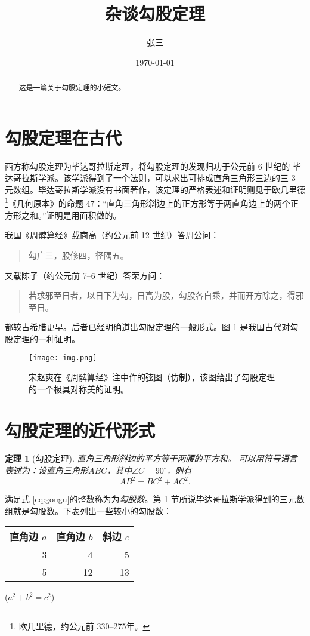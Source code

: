 \documentclass[UTF8,18pt]{ctexart}
\title{\heiti 杂谈勾股定理}
\author{\kaishu 张三}
\date{\today}
\newenvironment{myquote}
{\begin{quote}\kaishu\zihao{-5}}
	{\end{quote}}
\newtheorem{thm}{定理}
\begin{document}
	
\maketitle
\begin{abstract}
这是一篇关于勾股定理的小短文。
\end{abstract}
\tableofcontents
\section{勾股定理在古代}
西方称勾股定理为毕达哥拉斯定理，将勾股定理的发现归功于公元前 6 世纪的
毕达哥拉斯学派\cite{Kline}。该学派得到了一个法则，可以求出可排成直角三角形三边的三 3 元数组。毕达哥拉斯学派没有书面著作，该定理的严格表述和证明则见于欧几里德\footnote{欧几里德，约公元前 330--275年。}《几何原本》的命题 47：“直角三角形斜边上的正方形等于两直角边上的两个正方形之和。”证明是用面积做的。

我国《周髀算经》载商高（约公元前 12 世纪）答周公问：
\begin{myquote}
勾广三，股修四，径隅五。
\end{myquote}
又载陈子（约公元前 7--6 世纪）答荣方问：
\begin{myquote}
	若求邪至日者，以日下为勾，日高为股，勾股各自乘，并而开方除之，得邪至日。
\end{myquote}
都较古希腊更早。后者已经明确道出勾股定理的一般形式。图 \ref{fig:xiantu} 是我国古代对勾股定理的一种证明\cite{quanjing}。
\begin{figure}[ht]
	\centering
	\texttt{[image: img.png]}
	\caption{宋赵爽在《周髀算经》注中作的弦图（仿制），该图给出了勾股定理的一个极具对称美的证明。}
	\label{fig:xiantu}
\end{figure}
\section{勾股定理的近代形式}
\begin{thm}[勾股定理]
直角三角形斜边的平方等于两腰的平方和。
可以用符号语言表述为：设直角三角形$ABC$，其中$\angle C = 90^\circ$，则有
\begin{equation}\label{eq:gougu}
AB^2 = BC^2 + AC^2.
\end{equation} 
\end{thm}
满足式 \eqref{eq:gougu}的整数称为为\emph{勾股数}。第 1 节所说毕达哥拉斯学派得到的三元数组就是勾股数。下表列出一些较小的勾股数：

\begin{table}[H]
\centering
\begin{tabular}{|rrr|}
\hline
直角边 $a$ & 直角边 $b$ & 斜边 $c$\\
\hline
3 & 4 & 5 \\
5 & 12 & 13 \\
\hline
\end{tabular}%
\qquad
($a^2 + b^2 = c^2$)
\end{table}

\nocite{Shiye}
\nocite{LiuHaiYang}

\end{document}
